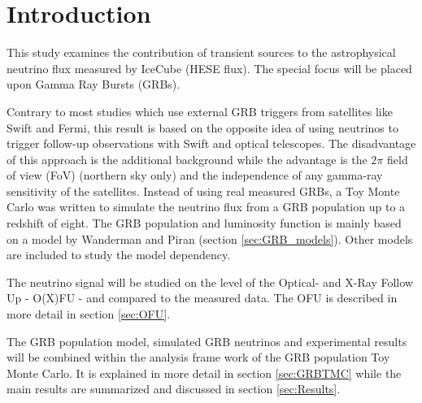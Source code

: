 \section{Introduction}
This study examines the contribution of transient sources to the astrophysical
neutrino flux measured by IceCube (HESE flux). The special focus will be
placed upon Gamma Ray Bursts (GRBs). 

Contrary to most studies which use external GRB triggers from satellites like
Swift and Fermi, this result is based on the opposite idea of using neutrinos
to trigger follow-up observations with Swift and optical telescopes. The
disadvantage of this approach is the additional background while the advantage
is the $2\pi$ field of view (FoV) (northern sky only) and the independence of 
any
gamma-ray sensitivity of the satellites.
Instead of using real measured GRBs, a Toy Monte Carlo was written to simulate
the neutrino flux from a GRB population up to a redshift of eight. The GRB
population and luminosity function is mainly based on a model by Wanderman and
Piran (section \ref{sec:GRB_models}). Other models are included to study the
model dependency.

The neutrino signal will be studied on the level of the Optical- and X-Ray
Follow Up - O(X)FU - and compared to the measured data. The OFU is described
in more detail in section \ref{sec:OFU}. 

The GRB population model, simulated GRB neutrinos and experimental results will
be combined within the analysis frame work of the GRB population Toy Monte
Carlo. It is explained in more detail in section \ref{sec:GRBTMC} while the main
results are summarized and discussed in section \ref{sec:Results}.